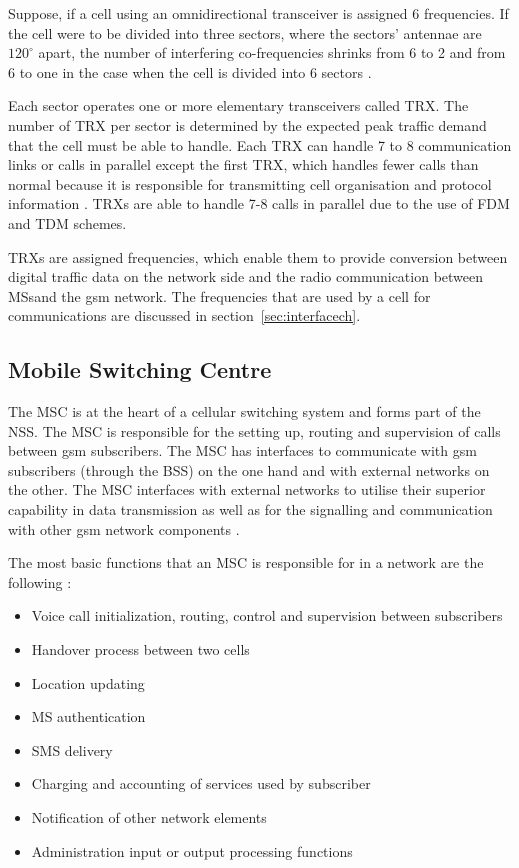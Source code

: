Suppose, if a cell using an omnidirectional transceiver is assigned 6 frequencies. If the cell were to be divided into three sectors, where the sectors' antennae are $120^\circ$ apart, the number of interfering co-frequencies shrinks from 6 to 2 and from 6 to one in the case when the cell is divided into 6 sectors \cite{GSMSysEngin,GSM92,GSMArchitectureProtocolsServices}.

Each sector operates one or more elementary transceivers called \gls{TRX}. The number of \gls{TRX} per sector is determined by the expected peak traffic demand that the cell must be able to handle. Each \gls{TRX} can handle 7 to 8 communication links or calls in parallel except the first \gls{TRX}, which handles fewer calls than normal because it is responsible for transmitting cell organisation and protocol information \cite{Eisenblatter}. \glspl{TRX} are able to handle 7-8 calls in parallel due to the use of \gls{FDM} and \gls{TDM} schemes. 

\glspl{TRX} are assigned frequencies, which enable them to provide conversion between digital traffic data on the network side and the radio communication between \glspl{MS}and the \gls{gsm} network\cite{ACOvsEA,FAPOrientationModel}. The frequencies that are used by a cell for communications are discussed in section~\ref{sec:interfacech}.

\subsection{Mobile Switching Centre}

The \gls{MSC} is at the heart of a cellular switching system and forms part of the \gls{NSS}. The \gls{MSC} is responsible for the setting up, routing and supervision of calls between \gls{gsm} subscribers\cite{GSM92,GSMSysEngin}. The \gls{MSC} has interfaces to communicate with \gls{gsm} subscribers (through the \gls{BSS}) on the one hand and with external networks on the other\cite{GSM92}. The \gls{MSC} interfaces with external networks to utilise their superior capability in data transmission as well as for the signalling and communication with other \gls{gsm} network components \cite{GSM92}. 

The most basic functions that an \gls{MSC} is responsible for in a network are the following \cite{wirelesstelcoMullet}:
\begin{itemize}
\item Voice call initialization, routing, control and supervision between subscribers
\item Handover process between two cells
\item Location updating
\item \gls{MS} authentication
\item \gls{SMS} delivery
\item Charging and accounting of services used by subscriber
\item Notification of other network elements
\item Administration input or output processing functions
\end{itemize}

